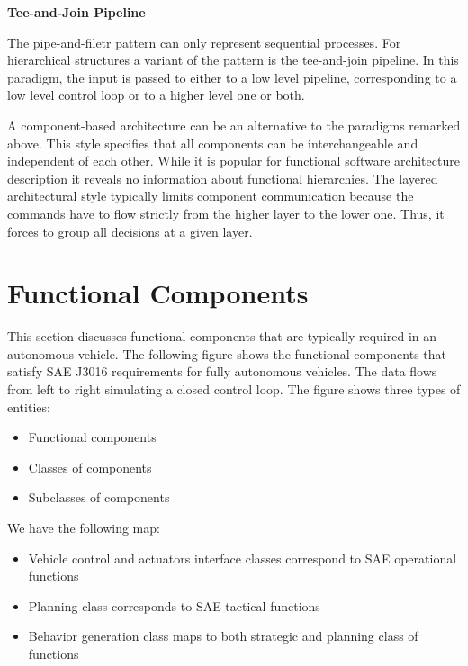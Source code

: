 \begin{framed}
\theoremstyle{remark}
\begin{remark}{\textbf{Tee-and-Join Pipeline}}

The pipe-and-filetr pattern can only represent sequential processes. For hierarchical structures a variant of the pattern is the tee-and-join pipeline.
In this paradigm, the input is passed to either to a low level pipeline, corresponding to a low level control loop or to a higher level one or both.

\end{remark}
\end{framed}

A component-based architecture can be an alternative to the paradigms remarked above. This style specifies that all
components can be interchangeable and independent of each other. While it is popular for functional software architecture description
it reveals no information about functional hierarchies. The layered architectural style typically limits component communication
because the commands have to flow strictly from the higher layer to the lower one. Thus, it forces to group all decisions at a given layer.

\section{Functional Components}
\label{functional_components}
This section discusses functional components that are typically required in an autonomous vehicle. The following figure shows the functional components
that satisfy SAE J3016 requirements for fully autonomous vehicles. The data flows from left to right simulating a closed control loop. The figure
shows three types of entities:

\begin{itemize}
\item Functional components 
\item Classes of components 
\item Subclasses of components
\end{itemize}

We have the following map:

\begin{itemize}
\item Vehicle control and actuators interface classes correspond to SAE operational functions  
\item Planning class corresponds to SAE tactical functions 
\item Behavior generation class maps to both strategic and planning class of functions
\end{itemize}

